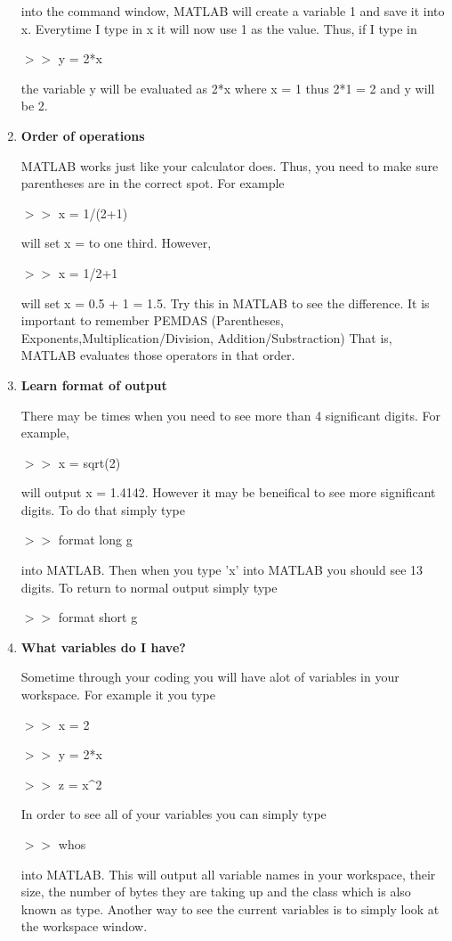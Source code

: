 \begin{enumerate}
into the command window, MATLAB will create a variable 1 and save it
into x. Everytime I type in x it will now use 1 as the value. Thus, if
I type in 

$>>$ y = 2*x

the variable y will be evaluated as 2*x where x = 1 thus 2*1 = 2 and y
will be 2.

\item \textbf{Order of operations}

MATLAB works just like your calculator does. Thus, you need to make
sure parentheses are in the correct spot. For example

$>>$ x = 1/(2+1) 

will set x = to one third. However, 

$>>$ x = 1/2+1

will set x = 0.5 + 1 = 1.5. Try this in MATLAB to see the
difference. It is important to remember PEMDAS (Parentheses,
Exponents,Multiplication/Division, Addition/Substraction) That is,
MATLAB evaluates those operators in that order.

\item \textbf{Learn format of output}

There may be times when you need to see more than 4 significant
digits. For example,

$>>$ x = sqrt(2)

will output x = 1.4142. However it may be beneifical to see more
significant digits. To do that simply type

$>>$ format long g

into MATLAB. Then when you type 'x' into MATLAB you should see 13
digits. To return to normal output simply type

$>>$ format short g

\item \textbf{ What variables do I have?}

Sometime through your coding you will have alot of variables in your
workspace. For example it you type

$>>$ x = 2

$>>$ y = 2*x

$>>$ z = x\textrm{\^}2

In order to see all of your variables you can simply type 

$>>$ whos

into MATLAB. This will output all variable names in your workspace,
their size, the number of bytes they are taking up and the class which
is also known as type. Another way to see the current variables is to
simply look at the workspace window.


\end{enumerate}
